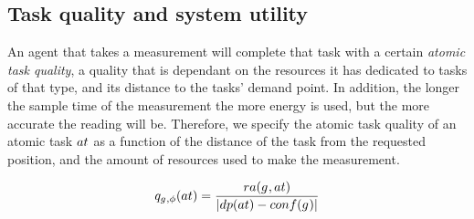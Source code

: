 \newcommand{\functionAtomicTaskQualitySignature}[2]{
	\functionSignature{q_{\varAgent{}{}, \varTime{}{}}} {\varAtomicTask{}{}}
}
\newcommand{\functionCompositeTaskValue}[2]{
	\functionSignature{ctv}{\varAtomicTask{}{}}
}

\newcommand{\functionSystemUtility}[2]{\functionSignature{u}{\setTime{}{}}}
\newcommand{\functionCompositeTaskQuality}[2]{
	\functionSignature{taq_\varTime{}{}}{\varCompositeTask{}{}}
}
\newcommand{\functionTaskAbsoluteValue}[2]{
	\functionSignature{atv}{\varCompositeTask{}{}, \varAtomicTask{}{}}
}
\subsection{Task quality and system utility}

An agent that takes a measurement will complete that task with a certain \textit{atomic task quality}, a quality that is dependant on the resources it has dedicated to tasks of that type, and its distance to the tasks' demand point.  In addition, the longer the sample time of the measurement the more energy is used, but the more accurate the reading will be. Therefore,  we specify the atomic task quality of an atomic task $\varAtomicTask{}{}$ as a function of the distance of the task from the requested position, and the amount of resources used to make the measurement. 

\begin{equation}
	\label{eq:atomic_task_quality}
	\functionAtomicTaskQualitySignature{}{} = 
		\frac
		{\functionTaskResourceAllocation{}{}}
		{\funcSize{
				\functionTaskDemandPoint{}{} - \functionDeployment{\varAgent{}{}}{} 
			}{} }
\end{equation}


